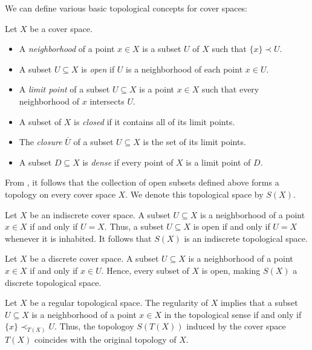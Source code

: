 \documentclass[reqno]{amsart}
\theoremstyle{definition}
\theoremstyle{remark}
\numberwithin{figure}{section}
\newcommand{\rb}{\prec}
\begin{document}
We can define various basic topological concepts for cover spaces:

\begin{defn}
Let $X$ be a cover space.
\begin{itemize}
\item A \emph{neighborhood} of a point $x \in X$ is a subset $U$ of $X$ such that $\{ x \} \rb U$.
\item A subset $U \subseteq X$ is \emph{open} if $U$ is a neighborhood of each point $x \in U$.
\item A \emph{limit point} of a subset $U \subseteq X$ is a point $x \in X$ such that every neighborhood of $x$ intersects $U$.
\item A subset of $X$ is \emph{closed} if it contains all of its limit points.
\item The \emph{closure} $\overline{U}$ of a subset $U \subseteq X$ is the set of its limit points.
\item A subset $D \subseteq X$ is \emph{dense} if every point of $X$ is a limit point of $D$.
\end{itemize}
\end{defn}

From , it follows that the collection of open subsets defined above forms a topology on every cover space $X$.
We denote this topological space by $S(X)$.

\begin{example}
Let $X$ be an indiscrete cover space.
A subset $U \subseteq X$ is a neighborhood of a point $x \in X$ if and only if $U = X$.
Thus, a subset $U \subseteq X$ is open if and only if $U = X$ whenever it is inhabited.
It follows that $S(X)$ is an indiscrete topological space.
\end{example}

\begin{example}
Let $X$ be a discrete cover space.
A subset $U \subseteq X$ is a neighborhood of a point $x \in X$ if and only if $x \in U$.
Hence, every subset of $X$ is open, making $S(X)$ a discrete topological space.
\end{example}

\begin{example}
Let $X$ be a regular topological space.
The regularity of $X$ implies that a subset $U \subseteq X$ is a neighborhood of a point $x \in X$ in the topological sense if and only if $\{ x \} \rb_{T(X)} U$.
Thus, the topologoy $S(T(X))$ induced by the cover space $T(X)$ coincides with the original topology of $X$.
\end{example}
\end{document}
